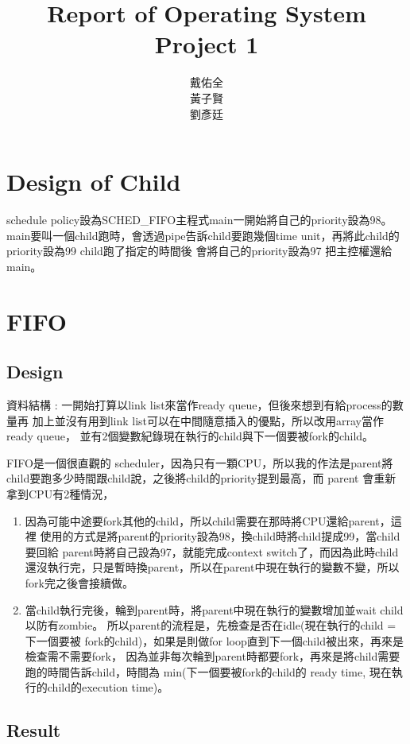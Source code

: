 \documentclass{article}
\title{Report of Operating System Project 1}
\author{戴佑全\\黃子賢\\劉彥廷}
\begin{document}
\begin{CJK}{UTF8}{bkai}
\maketitle

\section{Design of Child}
schedule policy設為SCHED\_FIFO主程式main一開始將自己的priority設為98。
main要叫一個child跑時，會透過pipe告訴child要跑幾個time unit，再將此child的priority設為99
child跑了指定的時間後 會將自己的priority設為97 把主控權還給main。

\section{FIFO}
\subsection{Design}

資料結構 : 一開始打算以link list來當作ready queue，但後來想到有給process的數量再
加上並沒有用到link list可以在中間隨意插入的優點，所以改用array當作ready queue，
並有2個變數紀錄現在執行的child與下一個要被fork的child。

FIFO是一個很直觀的 scheduler，因為只有一顆CPU，所以我的作法是parent將
child要跑多少時間跟child說，之後將child的priority提到最高，而 parent
會重新拿到CPU有2種情況，

\begin{enumerate}
  \item 因為可能中途要fork其他的child，所以child需要在那時將CPU還給parent，這裡 使用的方式是將parent的priority設為98，換child時將child提成99，當child要回給 parent時將自己設為97，就能完成context switch了，而因為此時child還沒執行完，只是暫時換parent，所以在parent中現在執行的變數不變，所以fork完之後會接續做。
  \item 當child執行完後，輪到parent時，將parent中現在執行的變數增加並wait child 以防有zombie。 所以parent的流程是，先檢查是否在idle(現在執行的child = 下一個要被 fork的child)，如果是則做for loop直到下一個child被出來，再來是檢查需不需要fork， 因為並非每次輪到parent時都要fork，再來是將child需要跑的時間告訴child，時間為 min(下一個要被fork的child的 ready time, 現在執行的child的execution time)。
\end{enumerate}

\subsection{Result}


\end{CJK}
\end{document}
